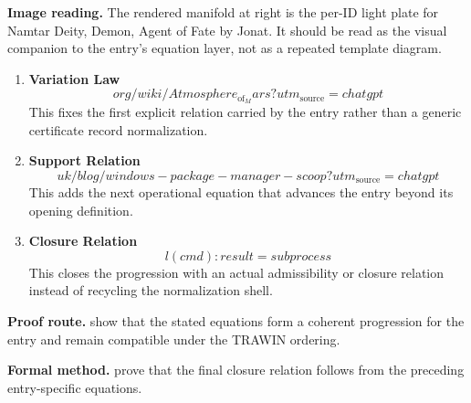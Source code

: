 \begin{samepage}
\noindent\begin{minipage}[t]{0.45\linewidth}
\vspace{0pt}
\raggedright
\scriptsize\textbf{Image reading.} The rendered manifold at right is the per-ID light plate for Namtar Deity, Demon, Agent of Fate by Jonat. It should be read as the visual companion to the entry's equation layer, not as a repeated template diagram.\par
\end{minipage}\hfill
\begin{minipage}[t]{0.53\linewidth}
\vspace*{-0.10in}
\raggedright
{}
\end{minipage}
\end{samepage}

\clearpage


\begin{enumerate}[leftmargin=1.6em,itemsep=9pt,topsep=6pt]
\item \textbf{Variation Law}
\[
org/wiki/Atmosphere_{\mathrm{of}}_Mars?utm_{\mathrm{source}}=chatgpt
\]
This fixes the first explicit relation carried by the entry rather than a generic certificate record normalization.

\item \textbf{Support Relation}
\[
uk/blog/windows-package-manager-scoop?utm_{\mathrm{source}}=chatgpt
\]
This adds the next operational equation that advances the entry beyond its opening definition.

\item \textbf{Closure Relation}
\[
l(cmd): result = subprocess
\]
This closes the progression with an actual admissibility or closure relation instead of recycling the normalization shell.
\end{enumerate}

\textbf{Proof route.} show that the stated equations form a coherent progression for the entry and remain compatible under the TRAWIN ordering.

\textbf{Formal method.} prove that the final closure relation follows from the preceding entry-specific equations.

\medskip
{}

